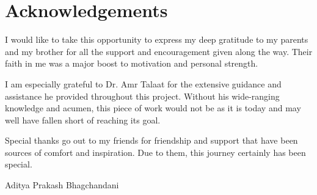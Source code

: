 \newpage
\section*{Acknowledgements}
I would like to take this opportunity to express my deep gratitude to my parents and my brother for all the support and encouragement given along the way. Their faith in me was a major boost to motivation and personal strength.
\vspace{0.5cm}

I am especially grateful to Dr. Amr Talaat for the extensive guidance and assistance he provided throughout this project. Without his wide-ranging knowledge and acumen, this piece of work would not be as it is today and may well have fallen short of reaching its goal.
\vspace{0.5cm} 

Special thanks go out to my friends for friendship and support that have been sources of comfort and inspiration. Due to them, this journey certainly has been special.
\vspace{1cm} 
\begin{flushright} 
Aditya Prakash Bhagchandani 
\vspace{1cm}

\end{flushright}